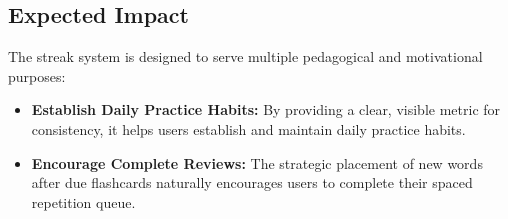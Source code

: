 \subsection*{Expected Impact}

The streak system is designed to serve multiple pedagogical and motivational purposes:

\begin{itemize}
    \item \textbf{Establish Daily Practice Habits:} By providing a clear, visible metric for consistency, it helps users establish and maintain daily practice habits.
    
    \item \textbf{Encourage Complete Reviews:} The strategic placement of new words after due flashcards naturally encourages users to complete their spaced repetition queue.
\end{itemize}
